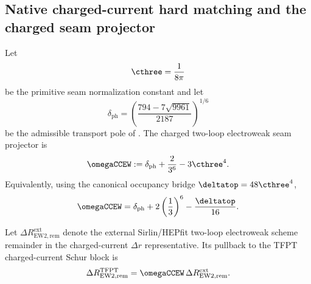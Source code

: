 \subsection{Native charged-current hard matching and the charged seam projector}

\begin{definition}
\label{def:charged-ew2-seam-projector}
Let
\[
\cthree=\frac{1}{8\pi}
\]
be the primitive seam normalization constant and let
\[
\delta_{\mathrm{ph}}
=
\left(
\frac{794-7\sqrt{9961}}{2187}
\right)^{1/6}
\]
be the admissible transport pole of . The charged two-loop
electroweak seam projector is
\begin{equation}
\label{eq:charged-ew2-seam-projector}
\omegaCCEW
:=
\delta_{\mathrm{ph}}
+
\frac{2}{3^6}
-
3\cthree^4.
\end{equation}
Equivalently, using the canonical occupancy bridge $\deltatop=48\cthree^4$,
\[
\omegaCCEW
=
\delta_{\mathrm{ph}}
+
2\left(\frac13\right)^6
-
\frac{\deltatop}{16}.
\]
\end{definition}

\begin{lemma}
\label{lem:charged-seam-projector-ew2}
Let $\Delta R_{\mathrm{EW2},\mathrm{rem}}^{\mathrm{ext}}$ denote the external
Sirlin/HEPfit two-loop electroweak scheme remainder in the charged-current
$\Delta r$ representative. Its pullback to the TFPT charged-current Schur block is
\begin{equation}
\label{eq:charged-seam-ew2-pullback}
\Delta R_{\mathrm{EW2},\mathrm{rem}}^{\mathrm{TFPT}}
=
\omegaCCEW\,
\Delta R_{\mathrm{EW2},\mathrm{rem}}^{\mathrm{ext}}.
\end{equation}
\end{lemma}

